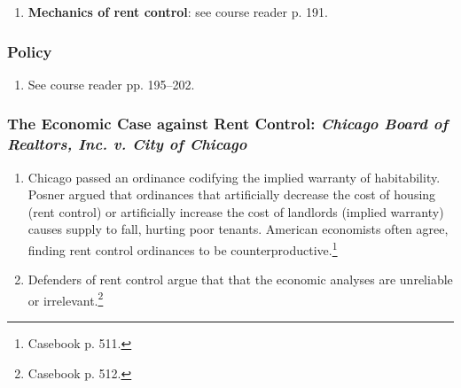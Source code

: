\begin{enumerate}
    \item \textbf{Mechanics of rent control}: see course reader p. 191.
\end{enumerate}

\subsubsection{Policy}

\begin{enumerate}
    \item See course reader pp. 195--202.
\end{enumerate}

\subsubsection{The Economic Case against Rent Control: \emph{Chicago Board of 
Realtors, Inc. v. City of Chicago}}

\begin{enumerate}
    \item Chicago passed an ordinance codifying the implied warranty of 
    habitability. Posner argued that ordinances that artificially decrease the 
    cost of housing (rent control) or artificially increase the 
    cost of landlords (implied warranty) causes supply to fall, hurting poor 
    tenants. American economists often agree, finding rent control ordinances 
    to be counterproductive.\footnote{Casebook p. 511.}
    \item Defenders of rent control argue that that the economic analyses are 
    unreliable or irrelevant.\footnote{Casebook p. 512.}
\end{enumerate}
